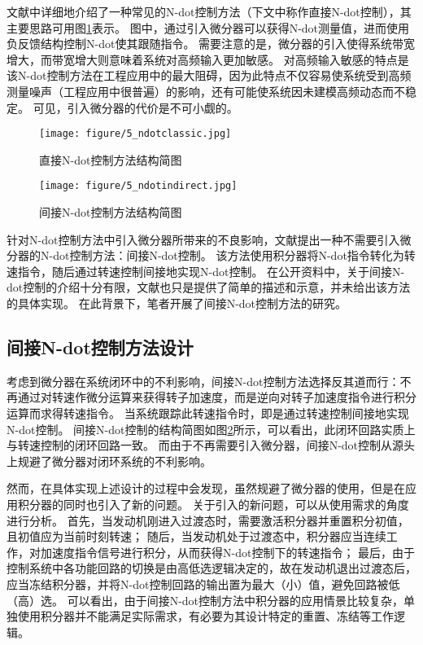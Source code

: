 \documentclass{article}
\begin{document}
文献\cite{Jaw2009Aircraft}中详细地介绍了一种常见的N-dot控制方法（下文中称作直接N-dot控制），其主要思路可用图\ref{fig:5_ndotclassic}表示。
图中，通过引入微分器可以获得N-dot测量值，进而使用负反馈结构控制N-dot使其跟随指令。
需要注意的是，微分器的引入使得系统带宽增大，而带宽增大则意味着系统对高频输入更加敏感\cite{Yang2016}。
对高频输入敏感的特点是该N-dot控制方法在工程应用中的最大阻碍，因为此特点不仅容易使系统受到高频测量噪声（工程应用中很普遍）的影响\cite{Ahrens2004Output,Vasiljevic2007Differentiation}，还有可能使系统因未建模高频动态而不稳定\cite{Dang2015}。
可见，引入微分器的代价是不可小觑的。
\begin{figure}[!ht]
    \centering
    \texttt{[image: figure/5\_ndotclassic.jpg]}
    \caption{直接N-dot控制方法结构简图}
    \label{fig:5_ndotclassic}
\end{figure}
\begin{figure}[!ht]
    \centering
    \texttt{[image: figure/5\_ndotindirect.jpg]}
    \caption{间接N-dot控制方法结构简图}
    \label{fig:5_ndotindirect}
\end{figure}
  
针对N-dot控制方法中引入微分器所带来的不良影响，文献\cite{MacIsaac2011Gas}提出一种不需要引入微分器的N-dot控制方法：间接N-dot控制。
该方法使用积分器将N-dot指令转化为转速指令，随后通过转速控制间接地实现N-dot控制。
在公开资料中，关于间接N-dot控制的介绍十分有限，文献\cite{MacIsaac2011Gas}也只是提供了简单的描述和示意，并未给出该方法的具体实现。
在此背景下，笔者开展了间接N-dot控制方法的研究。

\subsection{间接N-dot控制方法设计}
\label{sec:5_ndotindmthd}

考虑到微分器在系统闭环中的不利影响，间接N-dot控制方法选择反其道而行：不再通过对转速作微分运算来获得转子加速度，而是逆向对转子加速度指令进行积分运算而求得转速指令。
当系统跟踪此转速指令时，即是通过转速控制间接地实现N-dot控制。
间接N-dot控制的结构简图如图\ref{fig:5_ndotindirect}所示，可以看出，此闭环回路实质上与转速控制的闭环回路一致。
而由于不再需要引入微分器，间接N-dot控制从源头上规避了微分器对闭环系统的不利影响。

然而，在具体实现上述设计的过程中会发现，虽然规避了微分器的使用，但是在应用积分器的同时也引入了新的问题。
关于引入的新问题，可以从使用需求的角度进行分析。
首先，当发动机刚进入过渡态时，需要激活积分器并重置积分初值，且初值应为当前时刻转速；
随后，当发动机处于过渡态中，积分器应当连续工作，对加速度指令信号进行积分，从而获得N-dot控制下的转速指令；
最后，由于控制系统中各功能回路的切换是由高低选逻辑决定的\cite{H.AustinSpang1999Control,Jaw2009Aircraft}，故在发动机退出过渡态后，应当冻结积分器，并将N-dot控制回路的输出置为最大（小）值，避免回路被低（高）选。
可以看出，由于间接N-dot控制方法中积分器的应用情景比较复杂，单独使用积分器并不能满足实际需求，有必要为其设计特定的重置、冻结等工作逻辑。
\end{document}
